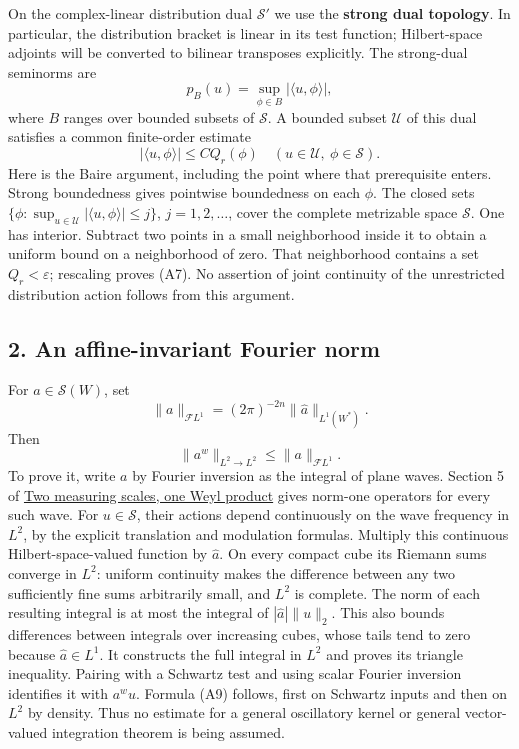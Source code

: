 \documentclass[
  11pt,
]{article}
\begin{document}
On the complex-linear distribution dual \(\mathcal S'\) we use the
\textbf{strong dual topology}. In particular, the distribution bracket
is linear in its test function; Hilbert-space adjoints will be converted
to bilinear transposes explicitly. The strong-dual seminorms are \[
p_B(u)=\sup_{\phi\in B}|\langle u,\phi\rangle|,
\tag{A6}
\] where \(B\) ranges over bounded subsets of \(\mathcal S\). A bounded
subset \(\mathcal U\) of this dual satisfies a common finite-order
estimate \[
|\langle u,\phi\rangle|\le C Q_r(\phi)
\quad(u\in\mathcal U,\ \phi\in\mathcal S).
\tag{A7}
\] Here is the Baire argument, including the point where that
prerequisite enters. Strong boundedness gives pointwise boundedness on
each \(\phi\). The closed sets
\(\{\phi:\sup_{u\in\mathcal U}|\langle u,\phi\rangle|\le j\}\),
\(j=1,2,\ldots\), cover the complete metrizable space \(\mathcal S\).
One has interior. Subtract two points in a small neighborhood inside it
to obtain a uniform bound on a neighborhood of zero. That neighborhood
contains a set \(Q_r<\varepsilon\); rescaling proves (A7). No assertion
of joint continuity of the unrestricted distribution action follows from
this argument.

\subsection{2. An affine-invariant Fourier
norm}\label{an-affine-invariant-fourier-norm}

For \(a\in\mathcal S(W)\), set \[
\|a\|_{\mathcal F L^1}=(2\pi)^{-2n}\|\widehat a\|_{L^1(W^*)}.
\tag{A8}
\] Then \[
\|a^w\|_{L^2\to L^2}\le \|a\|_{\mathcal F L^1}.
\tag{A9}
\] To prove it, write \(a\) by Fourier inversion as the integral of
plane waves. Section 5 of \href{weyl-metric-products.pdf}{Two measuring
scales, one Weyl product} gives norm-one operators for every such wave.
For \(u\in\mathcal S\), their actions depend continuously on the wave
frequency in \(L^2\), by the explicit translation and modulation
formulas. Multiply this continuous Hilbert-space-valued function by
\(\widehat a\). On every compact cube its Riemann sums converge in
\(L^2\): uniform continuity makes the difference between any two
sufficiently fine sums arbitrarily small, and \(L^2\) is complete. The
norm of each resulting integral is at most the integral of
\(|\widehat a|\|u\|_2\). This also bounds differences between integrals
over increasing cubes, whose tails tend to zero because
\(\widehat a\in L^1\). It constructs the full integral in \(L^2\) and
proves its triangle inequality. Pairing with a Schwartz test and using
scalar Fourier inversion identifies it with \(a^wu\). Formula (A9)
follows, first on Schwartz inputs and then on \(L^2\) by density. Thus
no estimate for a general oscillatory kernel or general vector-valued
integration theorem is being assumed.
\end{document}
